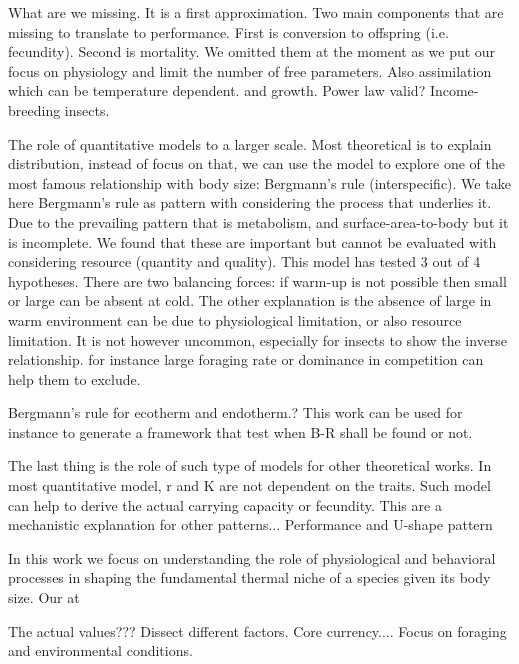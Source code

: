 What are we missing.
It is a first approximation. 
Two main components that are missing to translate to performance.
First is conversion to offspring (i.e. fecundity).
Second is mortality.
We omitted them at the moment as we put our focus on physiology and limit the number of free parameters.
Also assimilation which can be temperature dependent.
and growth.
Power law valid?
Income-breeding insects.

The role of quantitative models to a larger scale.
Most theoretical is to explain distribution, instead of focus on that, we can use the model to explore one of the most famous relationship with body size: Bergmann's rule (interspecific).
We take here Bergmann's rule as pattern with considering the process that underlies it.
Due to the prevailing pattern that is metabolism, and surface-area-to-body but it is incomplete.
We found that these are important but cannot be evaluated with considering resource (quantity and quality).
This model has tested 3 out of 4 hypotheses.
There are two balancing forces: if warm-up is not possible then small or large can be absent at cold.
The other explanation is the absence of large in warm environment can be due to physiological limitation, or also resource limitation.
It is not however uncommon, especially for insects to show the inverse relationship.
for instance large foraging rate or dominance in competition can help them to exclude.

 Bergmann's rule for ecotherm and endotherm.?
 This work can be used for instance to generate a framework that test when B-R shall be found or not.
 
 The last thing is the role of such type of models for other theoretical works.
 In most quantitative model, r and K are not dependent on the traits.
 Such model can help to derive the actual carrying capacity or fecundity.
 This are a mechanistic explanation for other patterns...
 Performance and U-shape pattern
  
    

In this work we focus on understanding the role of physiological and behavioral processes in shaping the fundamental thermal niche of a species given its body size.
Our at

The actual values???
Dissect different factors.
Core currency....
Focus on foraging and environmental conditions.


